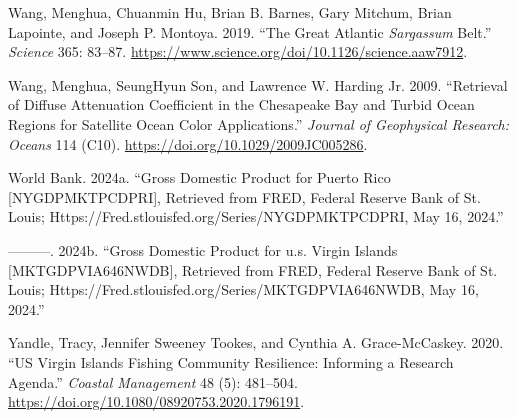 \documentclass[
  letterpaper,
  oneside,
  open=any]{scrbook}
\newlength{\cslhangindent}
\newenvironment{CSLReferences}[2] %
 {\begin{list}{}{%
  \setlength{\itemindent}{0pt}
  \setlength{\leftmargin}{0pt}
  \setlength{\parsep}{0pt}
  \ifodd #1
   \setlength{\leftmargin}{\cslhangindent}
   \setlength{\itemindent}{-1\cslhangindent}
  \fi
  \setlength{\itemsep}{#2\baselineskip}}}
 {\end{list}}
\begin{document}
\begin{CSLReferences}{1}{0}
Wang, Menghua, Chuanmin Hu, Brian B. Barnes, Gary Mitchum, Brian
Lapointe, and Joseph P. Montoya. 2019. {``The Great Atlantic
{\emph{Sargassum}} Belt.''} \emph{Science} 365: 83--87.
\url{https://www.science.org/doi/10.1126/science.aaw7912}.

Wang, Menghua, SeungHyun Son, and Lawrence W. Harding Jr. 2009.
{``Retrieval of Diffuse Attenuation Coefficient in the Chesapeake Bay
and Turbid Ocean Regions for Satellite Ocean Color Applications.''}
\emph{Journal of Geophysical Research: Oceans} 114 (C10).
\url{https://doi.org/10.1029/2009JC005286}.

World Bank. 2024a. {``Gross Domestic Product for Puerto Rico
{[}NYGDPMKTPCDPRI{]}, Retrieved from FRED, Federal Reserve Bank of St.
Louis; Https://Fred.stlouisfed.org/Series/NYGDPMKTPCDPRI, May 16,
2024.''}

---------. 2024b. {``Gross Domestic Product for u.s. Virgin Islands
{[}MKTGDPVIA646NWDB{]}, Retrieved from FRED, Federal Reserve Bank of St.
Louis; Https://Fred.stlouisfed.org/Series/MKTGDPVIA646NWDB, May 16,
2024.''}

Yandle, Tracy, Jennifer Sweeney Tookes, and Cynthia A. Grace-McCaskey.
2020. {``US Virgin Islands Fishing Community Resilience: Informing a
Research Agenda.''} \emph{Coastal Management} 48 (5): 481--504.
\url{https://doi.org/10.1080/08920753.2020.1796191}.

\end{CSLReferences}


\backmatter
\end{document}
